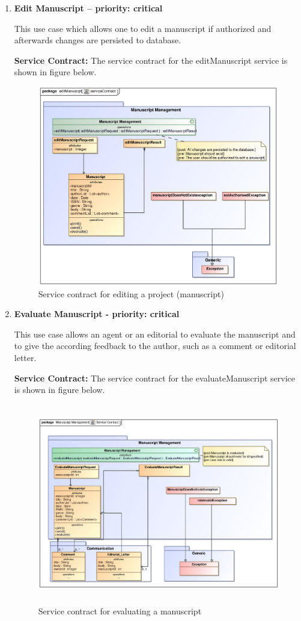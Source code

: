 \documentclass[12pt]{article}
\begin{document}
\begin{enumerate}
\newpage

\item \textbf{Edit Manuscript – priority: critical}
\par{This use case which allows one to edit a manuscript if authorized and afterwards changes are persisted to database.}

\par{\textbf{Service Contract:} The service contract for the editManuscript service is shown in figure below.}

\begin{figure}[h]
\includegraphics[height=330px, width=500px]{epsImages/ManuscriptManagement/editManuscript.eps}
\caption{Service contract for editing a  project (manuscript)}
\end{figure}
\newpage

\item \textbf{Evaluate Manuscript - priority: critical}
\par{This use case allows an agent or an editorial to evaluate the manuscript and to give the according feedback to the author, such as a comment or editorial letter.}

\par{\textbf{Service Contract:} The service contract for the evaluateManuscript service is shown in figure below.}

\begin{figure}[h]
\includegraphics[height=330px, width=500px]{epsImages/ManuscriptManagement/EvaluateManuscript.eps}
\caption{Service contract for evaluating a manuscript}
\end{figure}


\end{enumerate}
\end{document}

